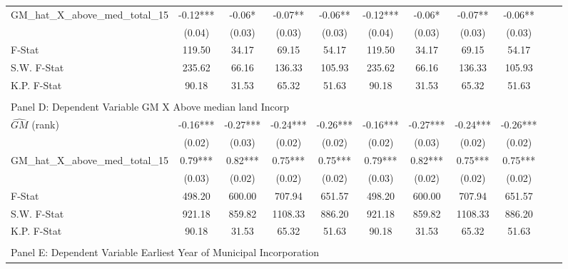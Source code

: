 \begin{table}[htbp]
\begin{threeparttable}
\begin{tabular}{l*{10}{c}}
\addlinespace
GM\_hat\_X\_above\_med\_total\_15&      -0.12***&      -0.06*  &      -0.07** &      -0.06** &      -0.12***&      -0.06*  &      -0.07** &      -0.06** \\
                &     (0.04)   &     (0.03)   &     (0.03)   &     (0.03)   &     (0.04)   &     (0.03)   &     (0.03)   &     (0.03)   \\
\midrule
F-Stat          &     119.50   &      34.17   &      69.15   &      54.17   &     119.50   &      34.17   &      69.15   &      54.17   \\
S.W. F-Stat     &     235.62   &      66.16   &     136.33   &     105.93   &     235.62   &      66.16   &     136.33   &     105.93   \\
K.P. F-Stat     &      90.18   &      31.53   &      65.32   &      51.63   &      90.18   &      31.53   &      65.32   &      51.63   \\
\cmidrule[\heavyrulewidth](lr){1-9} \\ \cmidrule[\heavyrulewidth](lr){1-9}
\multicolumn{8}{l}{Panel D: Dependent Variable GM X Above median land Incorp}\\
\cmidrule(lr){1-9}
$\hat{GM}$ (rank)&      -0.16***&      -0.27***&      -0.24***&      -0.26***&      -0.16***&      -0.27***&      -0.24***&      -0.26***\\
                &     (0.02)   &     (0.03)   &     (0.02)   &     (0.02)   &     (0.02)   &     (0.03)   &     (0.02)   &     (0.02)   \\
\addlinespace
GM\_hat\_X\_above\_med\_total\_15&       0.79***&       0.82***&       0.75***&       0.75***&       0.79***&       0.82***&       0.75***&       0.75***\\
                &     (0.03)   &     (0.02)   &     (0.02)   &     (0.02)   &     (0.03)   &     (0.02)   &     (0.02)   &     (0.02)   \\
\midrule
F-Stat          &     498.20   &     600.00   &     707.94   &     651.57   &     498.20   &     600.00   &     707.94   &     651.57   \\
S.W. F-Stat     &     921.18   &     859.82   &    1108.33   &     886.20   &     921.18   &     859.82   &    1108.33   &     886.20   \\
K.P. F-Stat     &      90.18   &      31.53   &      65.32   &      51.63   &      90.18   &      31.53   &      65.32   &      51.63   \\
\cmidrule[\heavyrulewidth](lr){1-9} \\ \cmidrule[\heavyrulewidth](lr){1-9}
\multicolumn{8}{l}{Panel E: Dependent Variable Earliest Year of Municipal Incorporation}\\

\end{tabular}
\end{threeparttable}
\end{table}
